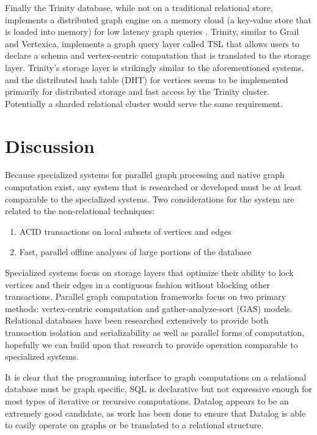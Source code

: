 \documentclass[11pt,letterpaper]{article}
\begin{document}
Finally the Trinity \cite{shao_trinity:_2013} database, while not on a traditional relational store, implements a distributed graph engine on a memory cloud (a key-value store that is loaded into memory) for low latency graph queries \cite{shao_trinity:_2013}. Trinity, similar to Grail and Vertexica, implements a graph query layer called TSL that allows users to declare a schema and vertex-centric computation that is translated to the storage layer. Trinity's storage layer is strikingly similar to the aforementioned systems, and the distributed hash table (DHT) for vertices seems to be implemented primarily for distributed storage and fast access by the Trinity cluster. Potentially a sharded relational cluster would serve the same requirement.

\section*{Discussion}

Because specialized systems for parallel graph processing and native graph computation exist, any system that is researched or developed must be at least comparable to the specialized systems. Two considerations for the system are related to the non-relational techniques:

\begin{enumerate}
	\item ACID transactions on local subsets of vertices and edges
	\item Fast, parallel offline analyses of large portions of the database
\end{enumerate}

Specialized systems focus on storage layers that optimize their ability to lock vertices and their edges in a contiguous fashion without blocking other transactions. Parallel graph computation frameworks focus on two primary methods: vertex-centric computation and gather-analyze-sort (GAS) models. Relational databases have been researched extensively to provide both transaction isolation and serializability as well as parallel forms of computation, hopefully we can build upon that research to provide operation comparable to specialized systems.

It is clear that the programming interface to graph computations on a relational database must be graph specific, SQL is declarative but not expressive enough for most types of iterative or recursive computations. Datalog appears to be an extremely good candidate, as work has been done to ensure that Datalog is able to easily operate on graphs or be translated to a relational structure.
\end{document}
